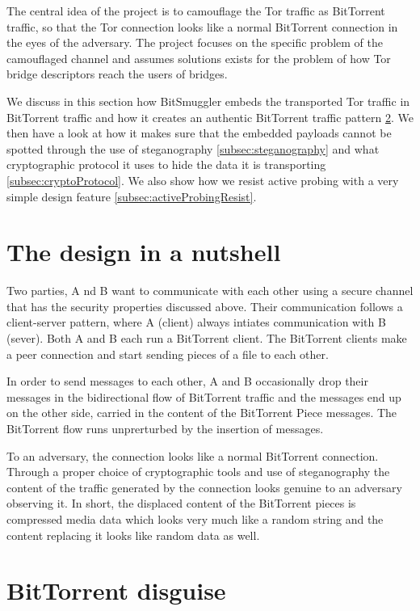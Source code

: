 \documentclass[11pt]{book} %
\newcommand{\projectName}{BitSmuggler }
\begin{document}
The central idea of the project is to camouflage the Tor traffic as BitTorrent traffic, so that the Tor connection looks like a normal BitTorrent connection in the eyes of the adversary. The project focuses on the specific problem of the camouflaged channel and assumes solutions exists for the problem of how Tor bridge descriptors reach the users of bridges.

We discuss in this section how \projectName embeds the transported Tor traffic in BitTorrent traffic and how it creates an authentic BitTorrent traffic pattern  \ref{subsec:btDisguise}. We then have a look at how it makes sure that the embedded payloads cannot be spotted through the use of steganography  \ref{subsec:steganography} and what cryptographic protocol it uses to hide the data it is transporting  \ref{subsec:cryptoProtocol}. We also show how we resist active probing with a very simple design feature 
 \ref{subsec:activeProbingResist}.

\section{The design in a nutshell}

Two parties, A nd B want to communicate with each other using a secure channel that has the security properties discussed above.  Their communication follows a client-server pattern, where A (client) always intiates communication with B (sever). Both A and B each run a BitTorrent client. The BitTorrent clients make a peer connection and start sending pieces of a file to each other.

In order to send messages to each other, A and B occasionally drop their messages in the bidirectional flow of BitTorrent traffic and the messages end up on the other side, carried in the content of the BitTorrent Piece messages. The BitTorrent flow runs unprerturbed by the insertion of messages. 

To an adversary, the connection looks like a normal BitTorrent connection. Through a proper choice of cryptographic tools and use of steganography the content of the traffic generated by the connection looks genuine to an adversary observing it. In short, the displaced content of the BitTorrent pieces is compressed media data which looks very much like a random string and the content replacing it looks like random data as well.

\section{BitTorrent disguise}
\label{subsec:btDisguise}
\end{document}
